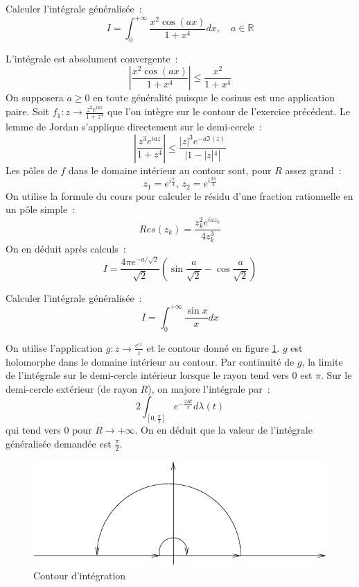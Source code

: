\documentclass[a4paper, 12pt]{amsart}
\begin{document}
\begin{fex}
 Calculer l'intégrale généralisée~:
\[
I = \int_0^{+\infty} \frac{x^2 \cos(ax)}{1+x^4} dx , \quad a \in
\mathbb{R}
\]
\end{fex}
L'intégrale est absolument convergente~:
\[
\left |  \frac{x^2 \cos(ax)}{1+x^4} \right | \leq \frac{x^2}{1+x^4}
\]
On supposera $a\geq0$ en toute généralité puisque le cosinus est une application
paire.
Soit $f_1 : z \to \frac{z^2 e^{iaz}}{1+z^4}$ que l'on intègre sur le contour
de l'exercice précédent.
Le lemme de Jordan s'applique directement sur le demi-cercle~:
\[
\left |
\frac{z^3 e^{iaz}}{1+z^4} 
\right | \leq \frac{|z|^3 e^{-a \Im(z)}}{|1-|z|^4|}
\]
Les pôles de $f$ dans le domaine intérieur au contour sont, pour $R$ assez
grand~:
\[
z_1 = e^{i\frac{\pi}{4}}, \, z_2 = e^{i\frac{3\pi}{4}}
\]
On utilise la formule du cours pour calculer le résidu d'une fraction
rationnelle en un pôle simple~: 
\[
Res(z_k) = \frac{z_k^2 e^{ia z_k}}{4 z_k^3}
\]
On en déduit après calculs~:
\[
I = \frac{4 \pi e^{-a/\sqrt{2}}}{\sqrt{2}} \left (
\sin\frac{a}{\sqrt{2}} - \cos \frac{a}{\sqrt{2}} \right )
\]

\begin{fex}
 Calculer l'intégrale généralisée~:
\[
I = \int_0^{+\infty} \frac{ \sin x}{x}dx
\]
\end{fex}
On utilise l'application $g : z \to \frac{e^{iz}}{z}$ et le contour donné en
figure \ref{fig:contour_sinc}. 
$g$ est
holomorphe dans le domaine intérieur au contour. Par continuité
de $g$, la  limite de l'intégrale
sur le demi-cercle intérieur lorsque le rayon tend vers 0 est $\pi$. 
Sur le
demi-cercle extérieur (de rayon $R$), on majore l'intégrale par~:
\[
2 \int_{[0, \frac{\pi}{2}]} e^{- \frac{2 R t}{\pi}} d\lambda(t)
\]
qui tend vers 0 pour $R \to + \infty$. On en déduit que la valeur de
l'intégrale généralisée demandée est $\frac{\pi}{2}$.
\begin{figure}[ht]
\includegraphics[scale=1]{contour_sinc.pdf}
\caption{Contour d'intégration}\label{fig:contour_sinc}
\end{figure}
\end{document}
